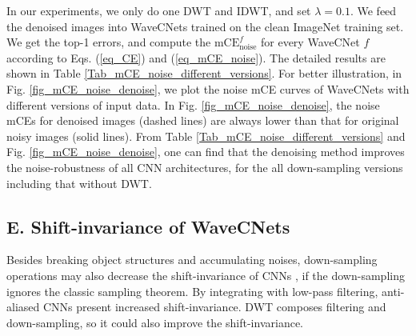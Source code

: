 In our experiments, we only do one DWT and IDWT, and set $\lambda = 0.1$.
We feed the denoised images into WaveCNets trained on the clean ImageNet training set.
We get the top-1 errors, and compute the $\text{mCE}_{\text{noise}}^f$
for every WaveCNet $f$ according to Eqs. (\ref{eq_CE}) and (\ref{eq_mCE_noise}).
The detailed results are shown in Table \ref{Tab_mCE_noise_different_versions}.
For better illustration, in Fig. \ref{fig_mCE_noise_denoise},
we plot the noise mCE curves of WaveCNets with different versions of input data.
In Fig. \ref{fig_mCE_noise_denoise}, the noise mCEs for denoised images (dashed lines)
are always lower than that for original noisy images (solid lines).
From Table \ref{Tab_mCE_noise_different_versions} and Fig. \ref{fig_mCE_noise_denoise},
one can find that the denoising method improves the noise-robustness of all CNN architectures,
for the all down-sampling versions including that without DWT.

\subsection*{E. Shift-invariance of WaveCNets}
Besides breaking object structures and accumulating noises,
down-sampling operations may also decrease the shift-invariance of CNNs \cite{azulay2018deep,zhang2019making},
if the down-sampling ignores the classic sampling theorem.
By integrating with low-pass filtering, anti-aliased CNNs \cite{zhang2019making} present increased shift-invariance.
DWT composes filtering and down-sampling, so it could also improve the shift-invariance.

